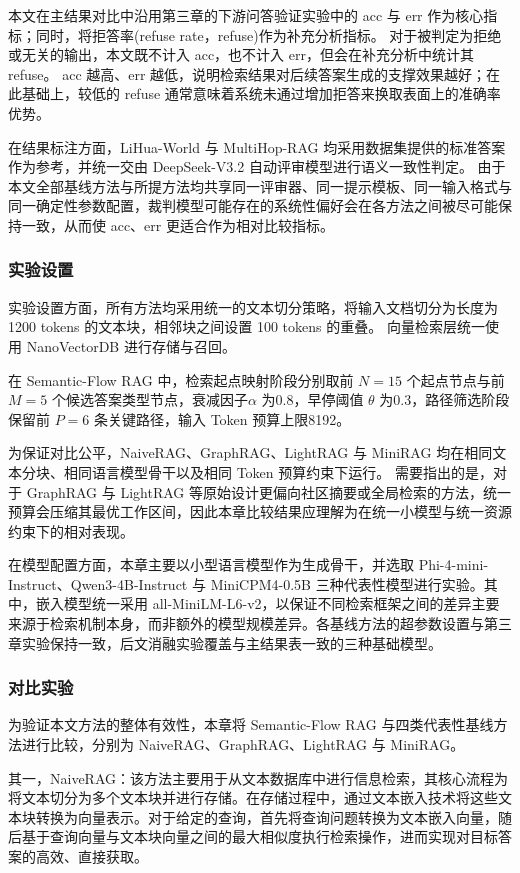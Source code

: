 \documentclass[promaster, vlined]{DissertUESTC}
\begin{document}
本文在主结果对比中沿用第三章的下游问答验证实验中的 acc 与 err 作为核心指标；同时，将拒答率(refuse rate，refuse)作为补充分析指标。
对于被判定为拒绝或无关的输出，本文既不计入 acc，也不计入 err，但会在补充分析中统计其 refuse。
acc 越高、err 越低，说明检索结果对后续答案生成的支撑效果越好；在此基础上，较低的 refuse 通常意味着系统未通过增加拒答来换取表面上的准确率优势。

在结果标注方面，LiHua-World 与 MultiHop-RAG 均采用数据集提供的标准答案作为参考，并统一交由 DeepSeek-V3.2 自动评审模型进行语义一致性判定。
由于本文全部基线方法与所提方法均共享同一评审器、同一提示模板、同一输入格式与同一确定性参数配置，裁判模型可能存在的系统性偏好会在各方法之间被尽可能保持一致，从而使 acc、err 更适合作为相对比较指标。

\subsubsection{实验设置}

实验设置方面，所有方法均采用统一的文本切分策略，将输入文档切分为长度为 1200 tokens 的文本块，相邻块之间设置 100 tokens 的重叠。
向量检索层统一使用 NanoVectorDB 进行存储与召回。

在 Semantic-Flow RAG 中，检索起点映射阶段分别取前 $N=15$ 个起点节点与前 $M=5$ 个候选答案类型节点，衰减因子$\alpha$ 为0.8，早停阈值 $\theta$ 为0.3，路径筛选阶段保留前 $P=6$ 条关键路径，输入 Token 预算上限8192。

为保证对比公平，NaiveRAG、GraphRAG、LightRAG 与 MiniRAG 均在相同文本分块、相同语言模型骨干以及相同 Token 预算约束下运行。
需要指出的是，对于 GraphRAG 与 LightRAG 等原始设计更偏向社区摘要或全局检索的方法，统一预算会压缩其最优工作区间，因此本章比较结果应理解为在统一小模型与统一资源约束下的相对表现。

在模型配置方面，本章主要以小型语言模型作为生成骨干，并选取 Phi-4-mini-Instruct、Qwen3-4B-Instruct 与 MiniCPM4-0.5B 三种代表性模型进行实验。其中，嵌入模型统一采用 all-MiniLM-L6-v2\cite{reimers2019sentence}，以保证不同检索框架之间的差异主要来源于检索机制本身，而非额外的模型规模差异。各基线方法的超参数设置与第三章实验保持一致，后文消融实验覆盖与主结果表一致的三种基础模型。

\subsubsection{对比实验}
为验证本文方法的整体有效性，本章将 Semantic-Flow RAG 与四类代表性基线方法进行比较，分别为 NaiveRAG、GraphRAG、LightRAG 与 MiniRAG。

其一，NaiveRAG\cite{lewis2020retrieval}：该方法主要用于从文本数据库中进行信息检索，其核心流程为将文本切分为多个文本块并进行存储。在存储过程中，通过文本嵌入技术将这些文本块转换为向量表示。对于给定的查询，首先将查询问题转换为文本嵌入向量，随后基于查询向量与文本块向量之间的最大相似度执行检索操作，进而实现对目标答案的高效、直接获取。
\end{document}
